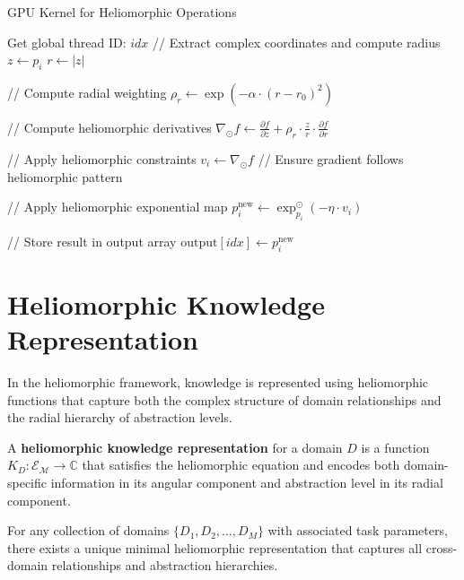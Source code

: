 \begin{algorithm}
\caption{GPU Kernel for Heliomorphic Operations}
\begin{algorithmic}[1]
    \State Get global thread ID: $idx$
        \State // Extract complex coordinates and compute radius
        \State $z \gets p_i$
        \State $r \gets |z|$
        
        \State // Compute radial weighting
        \State $\rho_r \gets \exp(-\alpha \cdot (r - r_0)^2)$
        
        \State // Compute heliomorphic derivatives
        \State $\nabla_{\odot} f \gets \frac{\partial f}{\partial z} + \rho_r \cdot \frac{z}{r} \cdot \frac{\partial f}{\partial r}$
        
        \State // Apply heliomorphic constraints
        \State $v_i \gets \nabla_{\odot} f$ // Ensure gradient follows heliomorphic pattern
        
        \State // Apply heliomorphic exponential map
        \State $p_i^{\text{new}} \gets \exp_{p_i}^{\odot}(-\eta \cdot v_i)$
        
        \State // Store result in output array
        \State $\text{output}[idx] \gets p_i^{\text{new}}$
    \EndIf
\EndFunction
\end{algorithmic}
\end{algorithm}

\section{Heliomorphic Knowledge Representation}

In the heliomorphic framework, knowledge is represented using heliomorphic functions that capture both the complex structure of domain relationships and the radial hierarchy of abstraction levels.

\begin{definition}
A \textbf{heliomorphic knowledge representation} for a domain $D$ is a function $K_D: \mathcal{E}_{\mathcal{M}} \rightarrow \mathbb{C}$ that satisfies the heliomorphic equation and encodes both domain-specific information in its angular component and abstraction level in its radial component.
\end{definition}

\begin{theorem}
For any collection of domains $\{D_1, D_2, \ldots, D_M\}$ with associated task parameters, there exists a unique minimal heliomorphic representation that captures all cross-domain relationships and abstraction hierarchies.
\end{theorem}

